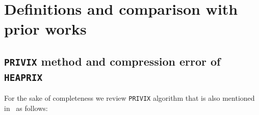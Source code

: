 \documentclass[sigconf, anonymous, review]{acmart}
\begin{document}
\section{Definitions and comparison with prior works}\label{app:comparison}

%

\subsection{\texttt{PRIVIX} method and compression error of \texttt{HEAPRIX}}
For the sake of completeness we review \texttt{PRIVIX} algorithm that is also mentioned in~\cite{li2019privacy} as follows:
\end{document}

